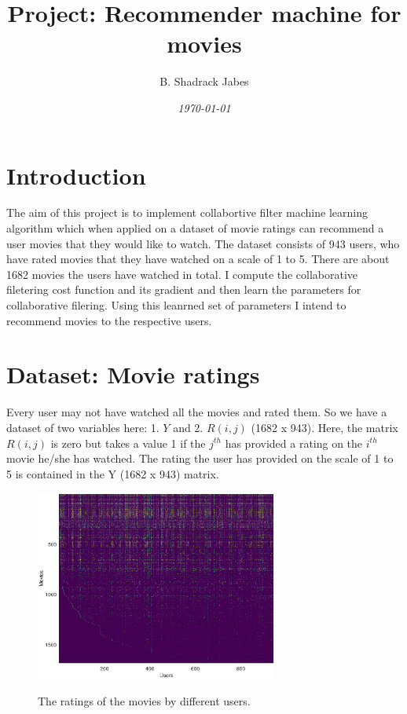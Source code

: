 \documentclass[twocolumn]{article}
\title {Project: Recommender machine for movies}
\author{B. Shadrack Jabes}
\date{\it{\today}}
\begin{document}
\maketitle

\section{Introduction}
The aim of this project is to implement collabortive filter machine learning algorithm which when applied on a dataset of movie ratings can recommend a user movies that they would like to watch.  The dataset consists of 943 users, who have rated movies that they have watched on a scale of 1 to 5. There are about 1682 movies the users have watched in total. 
I compute the collaborative filetering cost function and its gradient and then learn the parameters for collaborative filering. Using this leanrned set of parameters I intend to recommend movies to the respective users.

\section{Dataset: Movie ratings}
Every user may not have watched all the movies and rated them. So we have a dataset of two variables here: 1. $Y$ and 2. $R(i,j)$ (1682 x 943). Here, the matrix $R(i,j)$ is zero but takes a value 1 if the $j^{th}$ has provided a rating on the $i^{th}$ movie he/she has watched. The rating the user has provided on the scale of  1 to 5 is contained in the Y (1682 x 943) matrix.
           \begin{figure}
                \centering
                \includegraphics[clip=true,trim=0cm 0cm 0cm 0cm,width=8cm]{../r_ratings_movies_users.ps}\\
                        \caption{The ratings of the movies by different users.}
                \label{fig:dataset}
                \end{figure}
\end{document}
